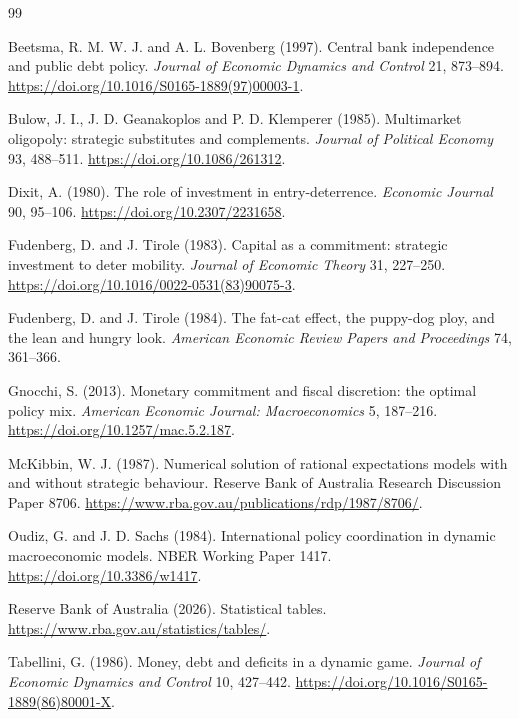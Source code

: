 \documentclass[11pt]{article}
\begin{document}
\begin{thebibliography}{99}

Beetsma, R. M. W. J. and A. L. Bovenberg (1997).
Central bank independence and public debt policy.
\emph{Journal of Economic Dynamics and Control} 21, 873--894.
\url{https://doi.org/10.1016/S0165-1889(97)00003-1}.

Bulow, J. I., J. D. Geanakoplos and P. D. Klemperer (1985).
Multimarket oligopoly: strategic substitutes and complements.
\emph{Journal of Political Economy} 93, 488--511.
\url{https://doi.org/10.1086/261312}.

Dixit, A. (1980).
The role of investment in entry-deterrence.
\emph{Economic Journal} 90, 95--106.
\url{https://doi.org/10.2307/2231658}.

Fudenberg, D. and J. Tirole (1983).
Capital as a commitment: strategic investment to deter mobility.
\emph{Journal of Economic Theory} 31, 227--250.
\url{https://doi.org/10.1016/0022-0531(83)90075-3}.

Fudenberg, D. and J. Tirole (1984).
The fat-cat effect, the puppy-dog ploy, and the lean and hungry look.
\emph{American Economic Review Papers and Proceedings} 74, 361--366.

Gnocchi, S. (2013).
Monetary commitment and fiscal discretion: the optimal policy mix.
\emph{American Economic Journal: Macroeconomics} 5, 187--216.
\url{https://doi.org/10.1257/mac.5.2.187}.

McKibbin, W. J. (1987).
Numerical solution of rational expectations models with and without strategic
behaviour. Reserve Bank of Australia Research Discussion Paper 8706.
\url{https://www.rba.gov.au/publications/rdp/1987/8706/}.

Oudiz, G. and J. D. Sachs (1984).
International policy coordination in dynamic macroeconomic models.
NBER Working Paper 1417.
\url{https://doi.org/10.3386/w1417}.

Reserve Bank of Australia (2026).
Statistical tables.
\url{https://www.rba.gov.au/statistics/tables/}.

Tabellini, G. (1986).
Money, debt and deficits in a dynamic game.
\emph{Journal of Economic Dynamics and Control} 10, 427--442.
\url{https://doi.org/10.1016/S0165-1889(86)80001-X}.

\end{thebibliography}
\end{document}

